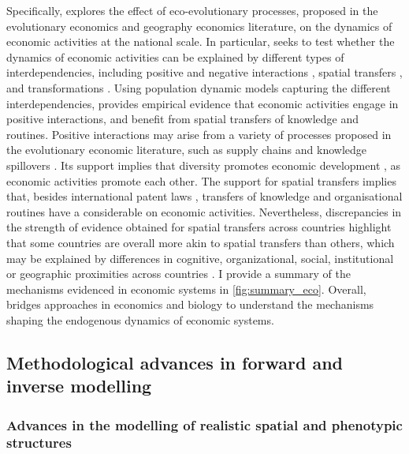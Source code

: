 Specifically, \chapiii explores the effect of eco-evolutionary processes, proposed in the evolutionary economics and geography economics literature, on the dynamics of economic activities at the national scale.
% 
In particular, \chapiii seeks to test whether the dynamics of economic activities can be explained by different types of interdependencies, including positive \xxx and negative interactions \xxx, spatial transfers \xxx, and transformations \xxx.
% 
Using population dynamic models capturing the different interdependencies, \chapiii provides empirical evidence that economic activities engage in positive interactions, and benefit from spatial transfers of knowledge and routines.
% 
Positive interactions may arise from a variety of processes proposed in the evolutionary economic literature, such as supply chains \citep{Ozman2009,Saavedra2009a} and knowledge spillovers \citep{Menon2015}. 
% 
Its support implies that diversity promotes economic development \citep{Hidalgo2018}, as economic activities promote each other.
% 
The support for spatial transfers implies that, besides international patent laws \xxx, transfers of knowledge and organisational routines have a considerable on economic activities. Nevertheless, discrepancies in the strength of evidence obtained for spatial transfers across countries highlight that some countries are overall more akin to spatial transfers than others, which may be explained by differences in cognitive, organizational, social, institutional or geographic proximities across countries \xxx .
% 
I provide a summary of the mechanisms evidenced in economic systems in \cref{fig:summary_eco}. Overall, \chapiii bridges approaches in economics and biology to understand the mechanisms shaping the endogenous dynamics of economic systems.

% 

% 

\subsection{Methodological advances in forward and inverse modelling}

\subsubsection{Advances in the modelling of realistic spatial and phenotypic structures}

